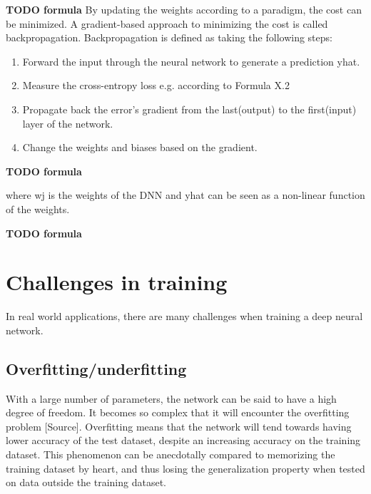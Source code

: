 \documentclass[english, bibtex]{kththesis}
\begin{document}
\textbf{TODO formula}
By updating the weights according to a paradigm, the cost can be minimized. A gradient-based approach to minimizing the cost is called backpropagation. Backpropagation is defined as taking the following steps:
\begin{enumerate}
\item Forward the input through the neural network to generate a prediction yhat.
\item Measure the cross-entropy loss e.g. according to Formula X.2
\item Propagate back the error’s gradient from the last(output) to the first(input) layer of the network.
\item Change the weights and biases based on the gradient.
\end{enumerate}

\textbf{TODO formula}

where wj is the weights of the DNN and yhat can be seen as a non-linear function of the weights.  

\textbf{TODO formula}

\section{Challenges in training}

In real world applications, there are many challenges when training a deep neural network.

\subsection{Overfitting/underfitting}

With a large number of parameters, the network can be said to have a high degree of freedom. It becomes so complex that it will encounter the overfitting problem [Source]. Overfitting means that the network will tend towards having lower accuracy of the test dataset, despite an increasing accuracy on the training dataset. This phenomenon can be anecdotally compared to memorizing the training dataset by heart, and thus losing the generalization property when tested on data outside the training dataset. 
\end{document}
